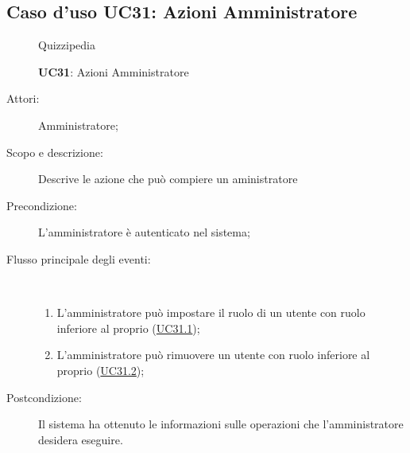 \subsection{Caso d'uso UC31: Azioni Amministratore}
\begin{figure}[H]
	\centering
	\begin{resizedtikzpicture}{\textwidth}
		\begin{umlsystem}[x=0, fill=lightgray!20]{Quizzipedia}
		\end{umlsystem}
	\end{resizedtikzpicture}
	\caption{\textbf{UC31}: Azioni Amministratore}
	\label{UC31}
\end{figure}
\begin{description}
	\item[Attori:] Amministratore;
	\item[Scopo e descrizione:] Descrive le azione che può compiere un aministratore
	\item[Precondizione:] L'amministratore è autenticato nel sistema;
	
	\item[Flusso principale degli eventi:] \ 
	\begin{enumerate}
		\item L'amministratore può impostare il ruolo di un utente con ruolo inferiore al proprio (\hyperlink{UC31.1}{UC31.1});
		\item L'amministratore può rimuovere un utente con ruolo inferiore al proprio (\hyperlink{UC31.2}{UC31.2});
		
	\end{enumerate}
	\item[Postcondizione:] Il sistema ha ottenuto le informazioni sulle operazioni che l’amministratore desidera eseguire.
\end{description}
\hypertarget{UC31.1}{}
